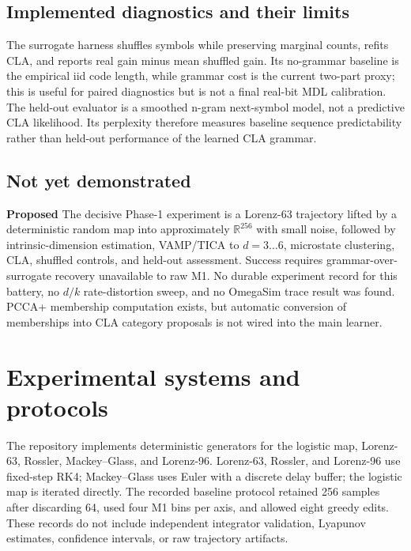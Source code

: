 \documentclass[11pt]{article}
\newcommand{\Proposed}{\textbf{Proposed}}
\begin{document}
\subsection{Implemented diagnostics and their limits}
The surrogate harness shuffles symbols while preserving marginal counts, refits CLA, and reports real gain minus mean shuffled gain. Its no-grammar baseline is the empirical iid code length, while grammar cost is the current two-part proxy; this is useful for paired diagnostics but is not a final real-bit MDL calibration. The held-out evaluator is a smoothed n-gram next-symbol model, not a predictive CLA likelihood. Its perplexity therefore measures baseline sequence predictability rather than held-out performance of the learned CLA grammar.

\subsection{Not yet demonstrated}
\Proposed{} The decisive Phase-1 experiment is a Lorenz-63 trajectory lifted by a deterministic random map into approximately $\mathbb{R}^{256}$ with small noise, followed by intrinsic-dimension estimation, VAMP/TICA to $d=3\ldots6$, microstate clustering, CLA, shuffled controls, and held-out assessment. Success requires grammar-over-surrogate recovery unavailable to raw M1. No durable experiment record for this battery, no $d/k$ rate-distortion sweep, and no OmegaSim trace result was found. PCCA+ membership computation exists, but automatic conversion of memberships into CLA category proposals is not wired into the main learner.

\section{Experimental systems and protocols}
The repository implements deterministic generators for the logistic map, Lorenz-63, Rossler, Mackey--Glass, and Lorenz-96. Lorenz-63, Rossler, and Lorenz-96 use fixed-step RK4; Mackey--Glass uses Euler with a discrete delay buffer; the logistic map is iterated directly. The recorded baseline protocol retained 256 samples after discarding 64, used four M1 bins per axis, and allowed eight greedy edits. These records do not include independent integrator validation, Lyapunov estimates, confidence intervals, or raw trajectory artifacts.
\end{document}
